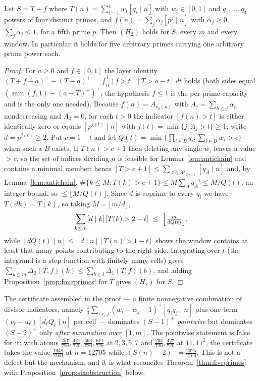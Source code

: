 \begin{theorem}\label{thm:fiveprimes}
Let $S=T+f$ where $T(n)=\sum_{i=1}^4w_i[q_i\mid n]$ with $w_i\in[0,1]$ and $q_1,\dots,q_4$ powers of
four distinct primes, and $f(n)=\sum_j\alpha_j[p^j\mid n]$ with $\alpha_j\ge0$, $\sum_j\alpha_j\le1$,
for a fifth prime $p$. Then $(H_2)$ holds for $S$, every $m$ and every window. In particular it holds
for five arbitrary primes carrying one arbitrary prime power each.
\end{theorem}
\begin{proof}
For $a\ge0$ and $f\in[0,1]$ the layer identity
$(T+f-a)^+-(T-a)^+=\int_0^1[f>t]\,[T>a-t]\,dt$
holds (both sides equal $(\min(f,1)-(a-T)^+)^+$; the hypothesis $f\le1$ is the per-prime capacity and
is the only one needed). Because $f(n)=A_{v_p(n)}$ with $A_j=\sum_{h\le j}\alpha_h$ nondecreasing and
$A_0=0$, for each $t>0$ the indicator $[f(n)>t]$ is either identically zero or equals $[p^{j(t)}\mid n]$
with $j(t)=\min\{j:A_j>t\}\ge1$; write $d=p^{j(t)}\ge2$. Put $c=1-t$ and let
$Q(t)=\min\{\prod_{i\in B}q_i:\sum_{i\in B}w_i>c\}$ when such a $B$ exists. If $T(n)>c+1$ then
deleting any single $w_i$ leaves a value $>c$, so the set of indices dividing $n$ is feasible for
Lemma~\ref{lem:antichain} and contains a minimal member; hence
$[T>c+1]\le\sum_{A\in\mathcal M_{Q(t)}}[q_A\mid n]$ and, by Lemma~\ref{lem:antichain},
$\#\{k\le M:T(k)>c+1\}\le M\sum_A q_A^{-1}\le M/Q(t)$, an integer bound, so $\le\lfloor M/Q(t)\rfloor$.
Since $d$ is coprime to every $q_i$ we have $T(dk)=T(k)$, so taking $M=\lfloor m/d\rfloor$,
\[
\sum_{k\le m}[d\mid k]\,[T(k)>2-t]\ \le\ \Bigl\lfloor\tfrac m{dQ(t)}\Bigr\rfloor ,
\]
while $[dQ(t)\mid n]\le[d\mid n][T(n)>1-t]$ shows the window contains at least that many points
contributing to the right side. Integrating over $t$ (the integrand is a step function with finitely
many cells) gives
$\sum_{k\le m}\Delta_2(T,f)(k)\le\sum_{b\in I}\Delta_1(T,f)(b)$, and adding
Proposition~\ref{prop:fourprimes} for $T$ gives $(H_2)$ for $S$.
\end{proof}

\begin{remark}\label{rem:aftersum}
The certificate assembled in the proof --- a finite nonnegative combination of divisor indicators,
namely $\tfrac13\sum_{i<j}(w_i+w_j-1)^+[q_iq_j\mid n]$ plus one term $(v_\ell-u_\ell)[d_\ell Q_\ell\mid n]$
per cell --- dominates $(S-1)^+$ \emph{pointwise} but dominates $(S-2)^+$ only \emph{after summation
over $[1,m]$}. The pointwise statement is false for it: with atoms
$\tfrac{257}{720},\tfrac{421}{720},\tfrac{563}{720},\tfrac{611}{720}$ at $2,3,5,7$ and
$\tfrac{293}{720},\tfrac{427}{720}$ at $11,11^2$, the certificate takes the value $\tfrac{1948}{2160}$
at $n=12705$ while $(S(n)-2)^+=\tfrac{2625}{2160}$. This is not a defect but the mechanism, and it is
what reconciles Theorem~\ref{thm:fiveprimes} with Proposition~\ref{prop:sixobstruction} below.
\end{remark}

